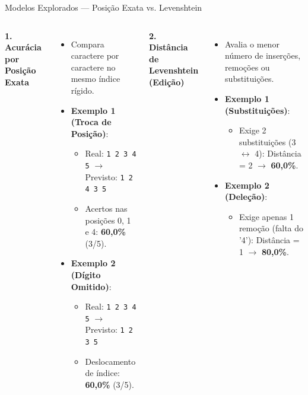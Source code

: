 \documentclass[
    aspectratio=169,
    12pt,
    brazil
]{beamer}
\begin{document}
\begin{frame}{Modelos Explorados — Posição Exata vs. Levenshtein}
  \begin{columns}[t]
    {\small\bfseries\color{senacblue}1. Acurácia por Posição Exata}
    \begin{itemize}\small
      \item Compara caractere por caractere no mesmo índice rígido.
      \item \textbf{Exemplo 1 (Troca de Posição)}:
        \begin{itemize}\scriptsize
          \item Real: \texttt{1 2 3 4 5} $\rightarrow$ Previsto: \texttt{1 2 4 3 5}
          \item Acertos nas posições 0, 1 e 4: \textbf{60,0\%} (3/5).
        \end{itemize}
      \item \textbf{Exemplo 2 (Dígito Omitido)}:
        \begin{itemize}\scriptsize
          \item Real: \texttt{1 2 3 4 5} $\rightarrow$ Previsto: \texttt{1 2 3 5}
          \item Deslocamento de índice: \textbf{60,0\%} (3/5).
        \end{itemize}
    \end{itemize}

    {\small\bfseries\color{senacblue}2. Distância de Levenshtein (Edição)}
    \begin{itemize}\small
      \item Avalia o menor número de inserções, remoções ou substituições.
      \item \textbf{Exemplo 1 (Substituições)}:
        \begin{itemize}\scriptsize
          \item Exige 2 substituições (3 $\leftrightarrow$ 4): Distância = 2 $\rightarrow$ \textbf{60,0\%}.
        \end{itemize}
      \item \textbf{Exemplo 2 (Deleção)}:
        \begin{itemize}\scriptsize
          \item Exige apenas 1 remoção (falta do '4'): Distância = 1 $\rightarrow$ \textbf{80,0\%}.
        \end{itemize}
    \end{itemize}
  \end{columns}

  \vspace{0.3cm}
  \centering
\end{frame}
\end{document}
